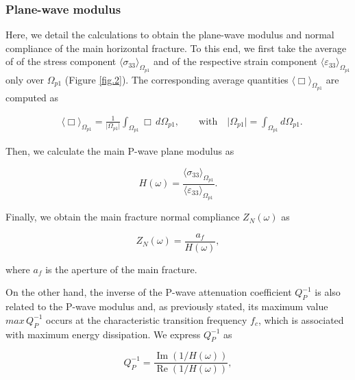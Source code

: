 \documentclass[draft]{agujournal2019}
\renewcommand{\Re}{\operatorname{Re} }
\renewcommand{\Im}{\operatorname{Im} }
\begin{document}
\subsubsection{Plane-wave modulus}

Here, we detail the calculations to obtain the plane-wave modulus and normal compliance of the main horizontal fracture.  To this end, we first take the average of  of the stress component $\langle \sigma_{33} \rangle_{\Omega_{p1}}$ and of the respective strain component $\langle \varepsilon_{33} \rangle_{\Omega_{p1}}$ only over $\Omega_{p1}$ (Figure \ref{fig.2}). The corresponding average quantities $\langle \Box \rangle_{\Omega_{p1}}$ are computed as
\begin{linenomath*}
\begin{equation}\label{Eq.10}
\begin{split}
&\langle \Box \rangle_{\Omega_{p1}} = \frac{1}{\vert \Omega_{p1} \vert} \int_{\Omega_{p1}} \Box \, d\Omega_{p1}, \qquad \text{with} \quad  \vert \Omega_{p1} \vert = \int_{\Omega_{p1}}  d\Omega_{p1}.
\end{split}
\end{equation}
\end{linenomath*}

Then, we calculate the main P-wave plane modulus as
\begin{linenomath*}
\begin{equation}\label{Eq.11}
H(\omega)= \frac{\langle \sigma_{33} \rangle_{\Omega_{p1}}}{\langle \varepsilon_{33} \rangle_{\Omega_{p1}}}.
\end{equation}
\end{linenomath*} 

Finally, we obtain the main fracture normal compliance $Z_N (\omega) $ as
\begin{linenomath*}
\begin{equation}\label{Eq.12}
Z_N(\omega)= \frac{a_f}{H(\omega)}, 
\end{equation}
\end{linenomath*} 
where $a_f$ is the aperture of the main fracture.

On the other hand, the inverse of the P-wave attenuation coefficient $Q_P^{-1}$ is also related to the P-wave modulus and, as previously stated, its maximum value $max\, Q_P^{-1} $ occurs at the characteristic transition frequency $f_c$, which is associated with maximum energy dissipation. We express $Q_P^{-1}$ as
\begin{linenomath*}
\begin{equation}\label{Eq.13}
Q_P^{-1}= \frac{\Im(1/H(\omega))}{\Re(1/H(\omega))}, 
\end{equation}
\end{linenomath*} 
\end{document}
